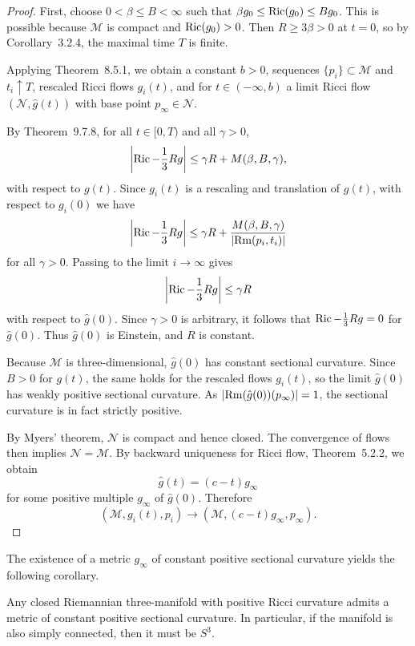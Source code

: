 \begin{proof}
First, choose \(0 < \beta \leq B < \infty\) such that
\(\beta g_0 \leq \operatorname{Ric}(g_0) \leq B g_0\). This is possible because \(\mathcal M\)
is compact and \(\operatorname{Ric}(g_0) > 0\). Then \(R \geq 3\beta > 0\) at \(t = 0\), so
by Corollary~3.2.4, the maximal time \(T\) is finite.

Applying Theorem~8.5.1, we obtain a constant \(b > 0\), sequences
\(\{p_i\} \subset \mathcal M\) and \(t_i \uparrow T\), rescaled Ricci flows
\(g_i(t)\), and for \(t \in (-\infty,b)\) a limit Ricci flow
\((\mathcal N,\hat g(t))\) with base point \(p_\infty \in \mathcal N\).

By Theorem~9.7.8, for all \(t \in [0,T)\) and all \(\gamma > 0\),
\[
\left|\operatorname{Ric} - \frac{1}{3}Rg\right| \leq \gamma R + M(\beta,B,\gamma),
\]
with respect to \(g(t)\). Since \(g_i(t)\) is a rescaling and translation of
\(g(t)\), with respect to \(g_i(0)\) we have
\[
\left|\operatorname{Ric} - \frac{1}{3}Rg\right|
\leq \gamma R + \frac{M(\beta,B,\gamma)}{\lvert \operatorname{Rm}(p_i,t_i)\rvert}
\]
for all \(\gamma > 0\). Passing to the limit \(i \to \infty\) gives
\[
\left|\operatorname{Ric} - \frac{1}{3}Rg\right| \leq \gamma R
\]
with respect to \(\hat g(0)\). Since \(\gamma > 0\) is arbitrary, it follows
that \(\operatorname{Ric} - \frac{1}{3}Rg = 0\) for \(\hat g(0)\). Thus \(\hat g(0)\) is
Einstein, and \(R\) is constant.

Because \(\mathcal M\) is three-dimensional, \(\hat g(0)\) has constant
sectional curvature. Since \(B > 0\) for \(g(t)\), the same holds for the
rescaled flows \(g_i(t)\), so the limit \(\hat g(0)\) has weakly positive
sectional curvature. As \(\lvert \operatorname{Rm}(\hat g(0))(p_\infty)\rvert = 1\), the sectional
curvature is in fact strictly positive.

By Myers' theorem, \(\mathcal N\) is compact and hence closed. The convergence
of flows then implies \(\mathcal N = \mathcal M\). By backward uniqueness for
Ricci flow, Theorem~5.2.2, we obtain
\[
\hat g(t) = (c-t)g_\infty
\]
for some positive multiple \(g_\infty\) of \(\hat g(0)\). Therefore
\[
(\mathcal{M}, g_i(t), p_i) \to (\mathcal{M}, (c-t)g_\infty, p_\infty).
\]
\end{proof}

The existence of a metric \(g_\infty\) of constant positive sectional
curvature yields the following corollary.

\begin{corollary}
\label{topping-ch10-space-form-corollary}
Any closed Riemannian three-manifold with positive Ricci curvature admits a
metric of constant positive sectional curvature. In particular, if the manifold
is also simply connected, then it must be \(S^3\).
\end{corollary}

